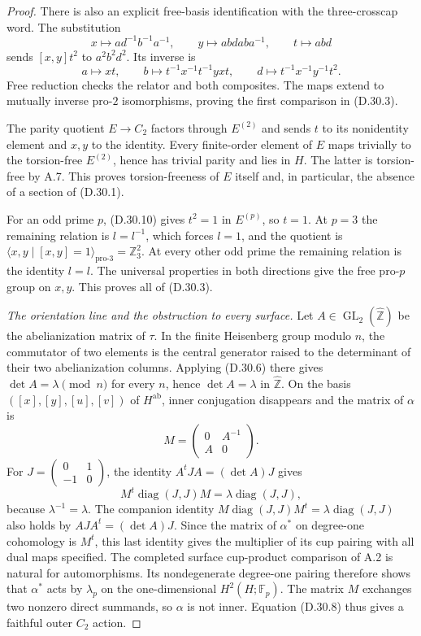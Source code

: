 \begin{proof}
There is also an explicit free-basis identification with the
three-crosscap word.  The substitution
\[
 x\mapsto a d^{-1}b^{-1}a^{-1},\qquad
 y\mapsto a b d a b a^{-1},\qquad t\mapsto abd
                                                        \tag{D.30.12}
\]
sends $[x,y]t^2$ to $a^2b^2d^2$.  Its inverse is
\[
 a\mapsto xt,\qquad
 b\mapsto t^{-1}x^{-1}t^{-1}yxt,\qquad
 d\mapsto t^{-1}x^{-1}y^{-1}t^2.
\]
Free reduction checks the relator and both composites.  The maps
extend to mutually inverse pro-$2$ isomorphisms, proving the first
comparison in (D.30.3).

The parity quotient $E\to C_2$ factors through $E^{(2)}$ and
sends $t$ to its nonidentity element and $x,y$ to the identity.
Every finite-order element of $E$ maps trivially to the torsion-free
$E^{(2)}$, hence has trivial parity and lies in $H$.
The latter is torsion-free by A.7.  This proves torsion-freeness of
$E$ itself and, in particular, the absence of a section of (D.30.1).

For an odd prime $p$, (D.30.10) gives $t^2=1$ in $E^{(p)}$,
so $t=1$.  At $p=3$ the remaining relation is $l=l^{-1}$,
which forces $l=1$, and the quotient is
$\langle x,y\mid[x,y]=1\rangle_{\mathrm{pro}\text{-}3}
=\mathbb Z_3^2$.  At every other odd prime the remaining relation
is the identity $l=l$.  The universal properties in both directions
give the free pro-$p$ group on $x,y$.  This proves all of (D.30.3).

\emph{The orientation line and the obstruction to every surface.}
Let $A\in\operatorname{GL}_2(\widehat{\mathbb Z})$ be the
abelianization matrix of $\tau$.  In the finite Heisenberg group
modulo $n$, the commutator of two elements is the central generator
raised to the determinant of their two abelianization columns.
Applying (D.30.6) there gives $\det A=\lambda\pmod n$ for every
$n$, hence $\det A=\lambda$ in $\widehat{\mathbb Z}$.
On the basis $([x],[y],[u],[v])$ of $H^{\mathrm{ab}}$, inner
conjugation disappears and the matrix of $\alpha$ is
\[
 M=\begin{pmatrix}0&A^{-1}\\A&0\end{pmatrix}.
\]
For $J=\left(\begin{smallmatrix}0&1\\-1&0\end{smallmatrix}\right)$,
the identity $A^tJA=(\det A)J$ gives
\[
 M^t\operatorname{diag}(J,J)M
       =\lambda\operatorname{diag}(J,J),                \tag{D.30.13}
\]
because $\lambda^{-1}=\lambda$.  The companion identity
$M\operatorname{diag}(J,J)M^t=\lambda\operatorname{diag}(J,J)$
also holds by $AJA^t=(\det A)J$.  Since the matrix of $\alpha^*$
on degree-one cohomology is $M^t$, this last identity gives the
multiplier of its cup pairing with all dual maps specified.
The completed surface cup-product comparison of A.2 is natural
for automorphisms.  Its nondegenerate degree-one pairing therefore
shows that $\alpha^*$ acts by $\lambda_p$ on the one-dimensional
$H^2(H;\mathbb F_p)$.  The matrix $M$ exchanges two nonzero direct
summands, so $\alpha$ is not inner.  Equation (D.30.8) thus gives
a faithful outer $C_2$ action.


\end{proof}
